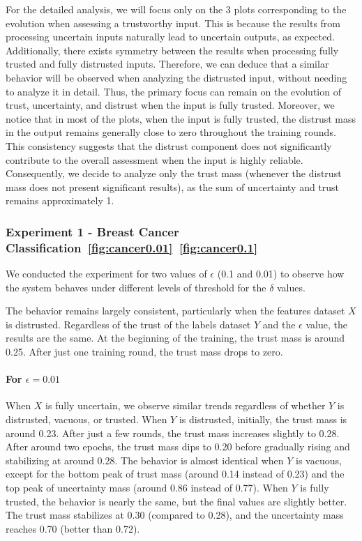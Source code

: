 For the detailed analysis, we will focus only on the 3 plots corresponding to the evolution when assessing a trustworthy input. This is because the results from processing uncertain inputs naturally lead to uncertain outputs, as expected. Additionally, there exists symmetry between the results when processing fully trusted and fully distrusted inputs. Therefore, we can deduce that a similar behavior will be observed when analyzing the distrusted input, without needing to analyze it in detail. Thus, the primary focus can remain on the evolution of trust, uncertainty, and distrust when the input is fully trusted.
Moreover, we notice that in most of the plots, when the input is fully trusted, the distrust mass in the output remains generally close to zero throughout the training rounds. This consistency suggests that the distrust component does not significantly contribute to the overall assessment when the input is highly reliable. Consequently, we decide to analyze only the trust mass (whenever the distrust mass does not present significant results), as the sum of uncertainty and trust remains approximately 1.







\subsubsection{Experiment 1 - Breast Cancer Classification~\ref{fig:cancer0.01}~\ref{fig:cancer0.1}}

We conducted the experiment for two values of \(\epsilon\) (0.1 and 0.01) to observe how the system behaves under different levels of threshold for the \(\delta\) values.

The behavior remains largely consistent, particularly when the features dataset \(X\) is distrusted. Regardless of the trust of the labels dataset \(Y\) and the \(\epsilon\) value, the results are the same. At the beginning of the training, the trust mass is around 0.25. After just one training round, the trust mass drops to zero.

\paragraph{For \(\epsilon = 0.01\)} 
When \(X\) is fully uncertain, we observe similar trends regardless of whether \(Y\) is distrusted, vacuous, or trusted. When \(Y\) is distrusted, initially, the trust mass is around 0.23. After just a few rounds, the trust mass increases slightly to 0.28. After around two epochs, the trust mass dips to 0.20 before gradually rising and stabilizing at around 0.28. 
The behavior is almost identical when \(Y\) is vacuous, except for the bottom peak of trust mass (around 0.14 instead of 0.23) and the top peak of uncertainty mass (around 0.86 instead of 0.77).
When \(Y\) is fully trusted, the behavior is nearly the same, but the final values are slightly better. The trust mass stabilizes at 0.30 (compared to 0.28), and the uncertainty mass reaches 0.70 (better than 0.72).

